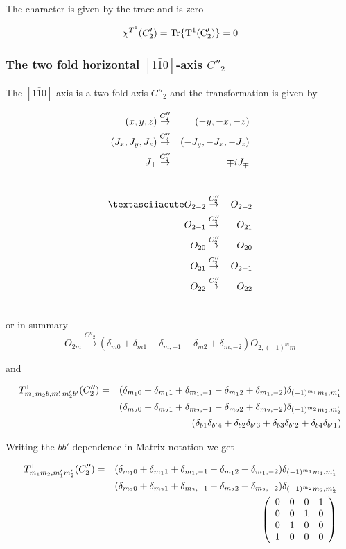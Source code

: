 The character is given by the trace and is zero

\begin{equation}
\chi^{T^1}(C'_2)=\rm Tr \{ T^1(C'_2) \}=0
\end{equation}


\subsubsection{The two fold horizontal $[1\bar 10]$-axis  $C''_2$}

 The    $[1\bar 10]$-axis is a two fold axis $C''_2$ and the transformation is given by

\begin{eqnarray}
(x,y,z) &\stackrel{C''_2}{\rightarrow}& (-y,-x,-z) \\ \nonumber
(J_x,J_y,J_z) &\stackrel{C''_2}{\rightarrow}&  (-J_y,-J_x,-J_z) \\ \nonumber
J_\pm &\stackrel{C''_2}{\rightarrow}& \mp i J_\mp \\ \nonumber
\end{eqnarray}

\begin{eqnarray}
´O_{2-2}&\stackrel{C''_2}{\rightarrow}&O_{2-2} \nn
O_{2-1}&\stackrel{C''_2}{\rightarrow}&O_{21} \nn
O_{20}&\stackrel{C''_2}{\rightarrow}&O_{20} \nn
O_{21}&\stackrel{C''_2}{\rightarrow}&O_{2-1}\nn
O_{22}&\stackrel{C''_2}{\rightarrow}&-O_{22}\nn
\end{eqnarray}

or in summary
\begin{equation}
O_{2m}\stackrel{C''_2}{\rightarrow} (\delta_{m0}+\delta_{m1}+\delta_{m,-1}-\delta_{m2}+\delta_{m,-2}) O_{2,(-1)^mm} 
\end{equation}

and 

\begin{eqnarray}
T^1_{m_1m_2b,m'_1m'_2b'}(C''_2)&=&(\delta_{m_10}+\delta_{m_11}+\delta_{m_1,-1}-\delta_{m_12}+\delta_{m_1,-2})
\delta_{(-1)^{m_1}m_1,m'_1}\\ \nonumber
&&(\delta_{m_20}+\delta_{m_21}+\delta_{m_2,-1}-\delta_{m_22}+\delta_{m_2,-2})
\delta_{(-1)^{m_2}m_2,m'_2}\\ \nonumber
&&(\delta_{b1}\delta_{b'4}+\delta_{b2}\delta_{b'3}+\delta_{b3}\delta_{b'2}+\delta_{b4}\delta_{b'1})
\end{eqnarray}

Writing the $bb'$-dependence in Matrix notation we get

\begin{eqnarray}\label{Cdd2}
T^1_{m_1m_2,m'_1m'_2}(C''_2)&=&(\delta_{m_10}+\delta_{m_11}+\delta_{m_1,-1}-\delta_{m_12}+\delta_{m_1,-2})
\delta_{(-1)^{m_1}m_1,m'_1}\\ \nonumber
&&(\delta_{m_20}+\delta_{m_21}+\delta_{m_2,-1}-\delta_{m_22}+\delta_{m_2,-2})
\delta_{(-1)^{m_2}m_2,m'_2}\\ \nonumber
&&\left (
\begin{array}{cccc}
0 & 0 & 0 & 1 \\
0 & 0 & 1 & 0 \\
0 & 1 & 0 & 0 \\
1 & 0 & 0 & 0 
\end{array} \right )
\end{eqnarray}


